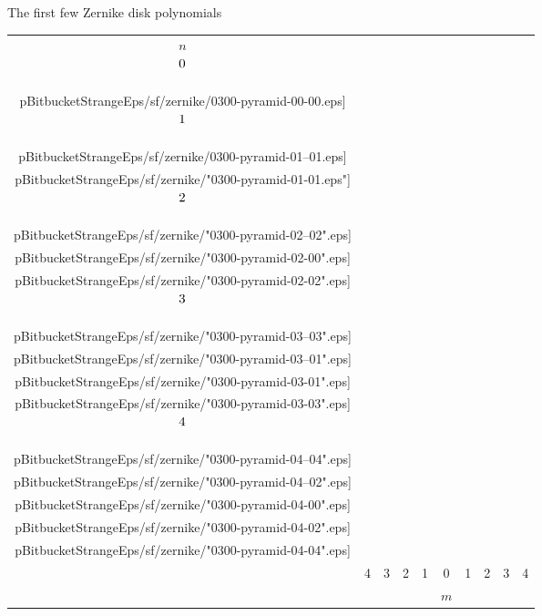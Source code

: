 \begin{frame}{The first few Zernike disk polynomials}
\begin{table}[htp]
		\begin{center}
			\begin{tabular}{c|ccccccccc}
				$n$ \\
				$\raisebox{12pt}{0}$ 
				&&&&&\texttt{[image:  \\pBitbucketStrangeEps/sf/zernike/0300-pyramid-00-00.eps]} \\
				$\raisebox{12pt}{1}$ 
				  &&&&\texttt{[image:  \\pBitbucketStrangeEps/sf/zernike/0300-pyramid-01--01.eps]} &&
				      \texttt{[image:  \\pBitbucketStrangeEps/sf/zernike/"0300-pyramid-01-01.eps"]} \\
				$\raisebox{12pt}{2}$ 
				  &&&\texttt{[image:  \\pBitbucketStrangeEps/sf/zernike/"0300-pyramid-02--02".eps]} &&
				     \texttt{[image:  \\pBitbucketStrangeEps/sf/zernike/"0300-pyramid-02-00".eps]} &&
				     \texttt{[image:  \\pBitbucketStrangeEps/sf/zernike/"0300-pyramid-02-02".eps]} \\
				$\raisebox{12pt}{3}$ 
				  &&\texttt{[image:  \\pBitbucketStrangeEps/sf/zernike/"0300-pyramid-03--03".eps]} &&
				    \texttt{[image:  \\pBitbucketStrangeEps/sf/zernike/"0300-pyramid-03--01".eps]} &&
				    \texttt{[image:  \\pBitbucketStrangeEps/sf/zernike/"0300-pyramid-03-01".eps]} &&
				    \texttt{[image:  \\pBitbucketStrangeEps/sf/zernike/"0300-pyramid-03-03".eps]} \\
				$\raisebox{12pt}{4}$ 
				  & \texttt{[image:  \\pBitbucketStrangeEps/sf/zernike/"0300-pyramid-04--04".eps]} &&
				    \texttt{[image:  \\pBitbucketStrangeEps/sf/zernike/"0300-pyramid-04--02".eps]} &&
				    \texttt{[image:  \\pBitbucketStrangeEps/sf/zernike/"0300-pyramid-04-00".eps]} &&
				    \texttt{[image:  \\pBitbucketStrangeEps/sf/zernike/"0300-pyramid-04-02".eps]} &&
				    \texttt{[image:  \\pBitbucketStrangeEps/sf/zernike/"0300-pyramid-04-04".eps]} \\\hline
				& 4 & 3 & 2 & 1 & 0 & 1 & 2 & 3 & 4 \\
				&&&&& $m$
			\end{tabular}
		\end{center}
	\label{tab:zernike pyramid 3d}
\end{table}%
\end{frame}

